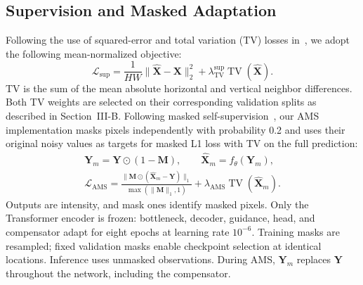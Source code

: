 \documentclass[journal]{IEEEtran}
\newcommand{\vect}[1]{\bm{#1}}
\begin{document}
\subsection{Supervision and Masked Adaptation}
Following the use of squared-error and total variation (TV) losses in~\cite{perera2022}, we adopt the following mean-normalized objective:
\begin{equation}
\mathcal{L}_{\mathrm{sup}}=
\frac{1}{HW}\lVert\widehat{\vect{X}}-\vect{X}\rVert_2^2
+\lambda_{\mathrm{TV}}^{\mathrm{sup}}\operatorname{TV}(\widehat{\vect{X}}).
\label{eq:supervised}
\end{equation}
TV is the sum of the mean absolute horizontal and vertical neighbor differences. Both TV weights are selected on their corresponding validation splits as described in Section~III-B. Following masked self-supervision~\cite{lin2025}, our AMS implementation masks pixels independently with probability 0.2 and uses their original noisy values as targets for masked L1 loss with TV on the full prediction:
\begin{equation}
\begin{gathered}
\vect{Y}_m=\vect{Y}\odot(1-\vect{M}),\qquad
\widehat{\vect{X}}_m=f_{\theta}(\vect{Y}_m),\\[3pt]
\mathcal{L}_{\mathrm{AMS}}=
\frac{\lVert\vect{M}\odot(\widehat{\vect{X}}_m-\vect{Y})\rVert_1}
{\max(\lVert\vect{M}\rVert_1,1)}
+\lambda_{\mathrm{AMS}}\operatorname{TV}(\widehat{\vect{X}}_m).
\end{gathered}
\label{eq:ams}
\end{equation}
Outputs are intensity, and mask ones identify masked pixels. Only the Transformer encoder is frozen: bottleneck, decoder, guidance, head, and compensator adapt for eight epochs at learning rate \(10^{-6}\). Training masks are resampled; fixed validation masks enable checkpoint selection at identical locations. Inference uses unmasked observations. During AMS, \(\vect{Y}_m\) replaces \(\vect{Y}\) throughout the network, including the compensator.
\end{document}
